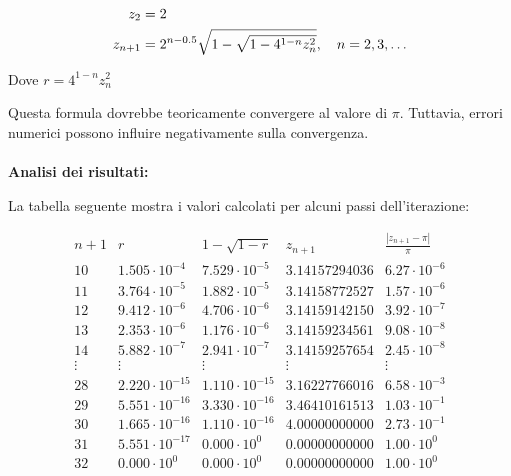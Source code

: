 \documentclass[a4paper, 11pt]{article}
\begin{document}
        \begin{align}
            z_2 &= 2 \notag \\
            z_{n+1} &= 2^{n - 0.5} \sqrt{1 - \sqrt{1 - 4^{1-n}z_n^2}}, \quad n = 2, 3, \dots \notag 
        \end{align}     



        Dove $r = 4^{1-n}z_n^2$



        Questa formula dovrebbe teoricamente convergere al valore di \( \pi \). Tuttavia, errori numerici possono influire negativamente sulla convergenza.

        \paragraph{}
        \textbf{Analisi dei risultati: }

        La tabella seguente mostra i valori calcolati per alcuni passi dell'iterazione:



        \[
        \begin{array}{cccccc}
        n+1 & r & 1 - \sqrt{1 - r} & z_{n+1} & \frac{|z_{n+1} - \pi|}{\pi} \\
        \hline
        10 & 1.505\cdot10^{-4} & 7.529\cdot10^{-5} & 3.14157294036 & 6.27\cdot10^{-6} \\
        11 & 3.764\cdot10^{-5} & 1.882\cdot10^{-5} & 3.14158772527 & 1.57\cdot10^{-6} \\
        12 & 9.412\cdot10^{-6} & 4.706\cdot10^{-6} & 3.14159142150 & 3.92\cdot10^{-7} \\
        13 & 2.353\cdot10^{-6} & 1.176\cdot10^{-6} & 3.14159234561 & 9.08\cdot10^{-8} \\
        14 & 5.882\cdot10^{-7} & 2.941\cdot10^{-7} & 3.14159257654 & 2.45\cdot10^{-8} \\
        \vdots & \vdots & \vdots & \vdots & \vdots \\
        28 & 2.220\cdot10^{-15} & 1.110\cdot10^{-15} & 3.16227766016 & 6.58\cdot10^{-3} \\
        29 & 5.551\cdot10^{-16} & 3.330\cdot10^{-16} & 3.46410161513 & 1.03\cdot10^{-1} \\
        30 & 1.665\cdot10^{-16} & 1.110\cdot10^{-16} & 4.00000000000 & 2.73\cdot10^{-1} \\
        31 & 5.551\cdot10^{-17} & 0.000\cdot10^{0} & 0.00000000000 & 1.00\cdot10^{0} \\
        32 & 0.000\cdot10^{0} & 0.000\cdot10^{0} & 0.00000000000 & 1.00\cdot10^{0} \\
        \end{array}
        \]
\end{document}
